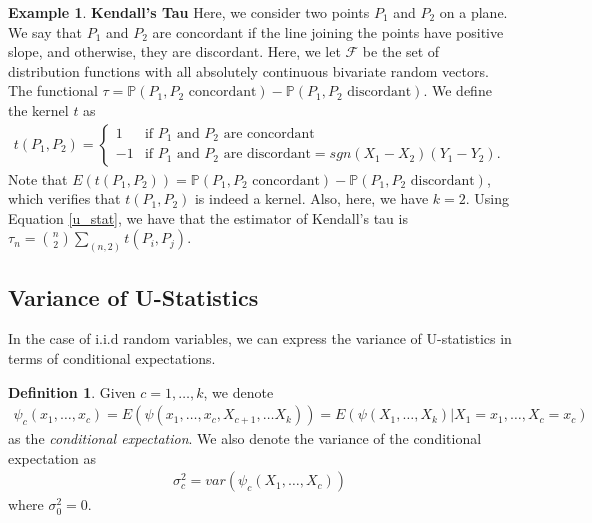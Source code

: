 \documentclass{article}
\theoremstyle{definition}
\newtheorem{Def}{Definition}
\numberwithin{Def}{section}
\newtheorem{ex}{Example}
\begin{document}
\begin{ex}\textbf{Kendall's Tau} Here, we consider two points $P_1$ and $P_2$ on a plane. We say that $P_1$ and $P_2$ are concordant if the line joining the points have positive slope, and otherwise, they are discordant. Here, we let $\mathcal{F}$ be the set of distribution functions with all absolutely continuous bivariate random vectors. The functional $\tau = \mathbb{P}(P_1, P_2 \text{ concordant}) - \mathbb{P}(P_1, P_2 \text{ discordant})$. We define the kernel $t$ as 
\begin{align*}
    t(P_1, P_2) = \begin{cases} 1 & \text{if $P_1$ and $P_2$ are concordant} \\ -1 & \text{if $P_1$ and $P_2$ are discordant} = sgn(X_1 - X_2)(Y_1 - Y_2).
    \end{cases}
\end{align*}
Note that $E(t(P_1, P_2)) = \mathbb{P}(P_1, P_2 \text{ concordant}) - \mathbb{P}(P_1, P_2 \text{ discordant})$, which verifies that $t(P_1, P_2)$ is indeed a kernel. Also, here, we have $k=2$. Using Equation \ref{u_stat}, we have that the estimator of Kendall's tau is $\tau_n = {n \choose 2}\sum_{(n,2)}t(P_i, P_j)$.
\end{ex}

\subsection{Variance of U-Statistics}
In the case of i.i.d random variables, we can express the variance of U-statistics in terms of conditional expectations. 

\begin{Def}
Given $c = 1, \dotsc, k$, we denote \begin{align}
    \psi_c(x_1, \dotsc, x_c) = E(\psi(x_1, \dotsc, x_c, X_{c+1}, \dotsc X_k)) = E(\psi(X_1, \dotsc, X_k)|X_1 = x_1, \dotsc, X_c = x_c)
\end{align}
as the \textit{conditional expectation}. We also denote the variance of the conditional expectation as 
\begin{align}
    \sigma_c^2 = var(\psi_c(X_1, \dotsc, X_c))
\end{align}
where $\sigma_0^2 = 0$. 
\end{Def}
\end{document}
